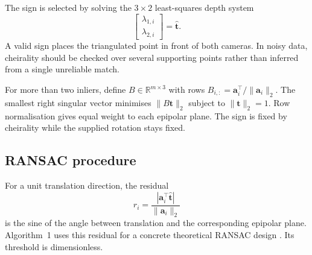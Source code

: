 \documentclass[10pt,a4paper,twocolumn]{article}
\newcommand{\R}{\mathbf R}
\newcommand{\ttt}{\mathbf t}
\newcommand{\ff}{\mathbf f}
\newcommand{\avec}{\mathbf a}
\begin{document}
The sign is selected by solving the $3\times2$ least-squares depth system
\begin{equation}
 [\,\ff_{1,i}\quad-\R\ff_{2,i}\,]
 \begin{bmatrix}\lambda_{1,i}\\\lambda_{2,i}\end{bmatrix}
 =\widehat{\ttt}.
 \label{eq:depthsign}
\end{equation}
A valid sign places the triangulated point in front of both cameras. In noisy data, cheirality should be checked over several supporting points rather than inferred from a single unreliable match.

For more than two inliers, define $B\in\mathbb R^{m\times3}$ with rows $B_{i,:}=\avec_i^\top/\|\avec_i\|_2$. The smallest right singular vector minimises $\|B\ttt\|_2$ subject to $\|\ttt\|_2=1$. Row normalisation gives equal weight to each epipolar plane. The sign is fixed by cheirality while the supplied rotation stays fixed.

\subsection{RANSAC procedure}
For a unit translation direction, the residual
\begin{equation}
 r_i=\frac{|\avec_i^\top\widehat{\ttt}|}{\|\avec_i\|_2}
 \label{eq:residual}
\end{equation}
is the sine of the angle between translation and the corresponding epipolar plane. Algorithm~1 uses this residual for a concrete theoretical RANSAC design \cite{fischler1981random}. Its threshold is dimensionless.
\end{document}
